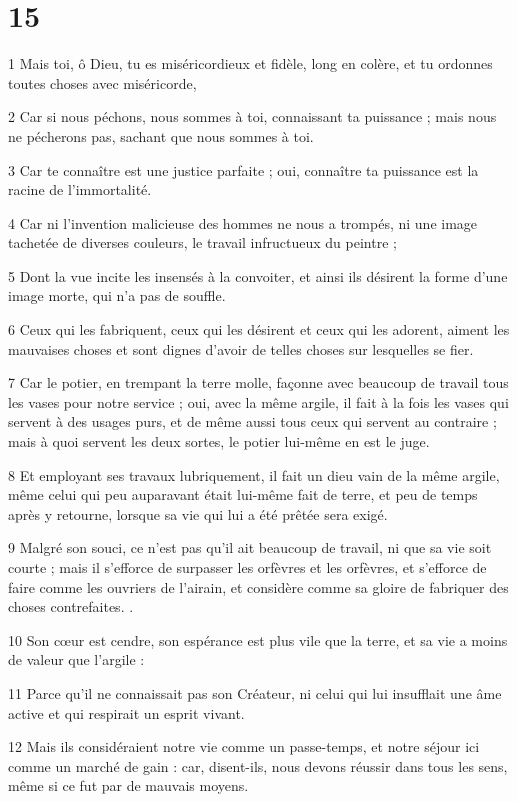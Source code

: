 \chapter{15}

\par 1 Mais toi, ô Dieu, tu es miséricordieux et fidèle, long en colère, et tu ordonnes toutes choses avec miséricorde,
\par 2 Car si nous péchons, nous sommes à toi, connaissant ta puissance ; mais nous ne pécherons pas, sachant que nous sommes à toi.
\par 3 Car te connaître est une justice parfaite ; oui, connaître ta puissance est la racine de l'immortalité.
\par 4 Car ni l'invention malicieuse des hommes ne nous a trompés, ni une image tachetée de diverses couleurs, le travail infructueux du peintre ;
\par 5 Dont la vue incite les insensés à la convoiter, et ainsi ils désirent la forme d'une image morte, qui n'a pas de souffle.
\par 6 Ceux qui les fabriquent, ceux qui les désirent et ceux qui les adorent, aiment les mauvaises choses et sont dignes d'avoir de telles choses sur lesquelles se fier.
\par 7 Car le potier, en trempant la terre molle, façonne avec beaucoup de travail tous les vases pour notre service ; oui, avec la même argile, il fait à la fois les vases qui servent à des usages purs, et de même aussi tous ceux qui servent au contraire ; mais à quoi servent les deux sortes, le potier lui-même en est le juge.
\par 8 Et employant ses travaux lubriquement, il fait un dieu vain de la même argile, même celui qui peu auparavant était lui-même fait de terre, et peu de temps après y retourne, lorsque sa vie qui lui a été prêtée sera exigé.
\par 9 Malgré son souci, ce n'est pas qu'il ait beaucoup de travail, ni que sa vie soit courte ; mais il s'efforce de surpasser les orfèvres et les orfèvres, et s'efforce de faire comme les ouvriers de l'airain, et considère comme sa gloire de fabriquer des choses contrefaites. .
\par 10 Son cœur est cendre, son espérance est plus vile que la terre, et sa vie a moins de valeur que l'argile :
\par 11 Parce qu'il ne connaissait pas son Créateur, ni celui qui lui insufflait une âme active et qui respirait un esprit vivant.
\par 12 Mais ils considéraient notre vie comme un passe-temps, et notre séjour ici comme un marché de gain : car, disent-ils, nous devons réussir dans tous les sens, même si ce fut par de mauvais moyens.
